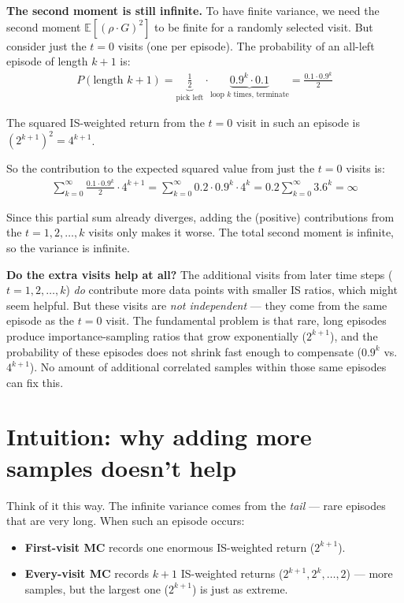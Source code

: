 \documentclass[11pt]{article}
\begin{document}
\textbf{The second moment is still infinite.} To have finite variance, we need the second moment $\mathbb{E}[(\rho \cdot G)^2]$ to be finite for a randomly selected visit. But consider just the $t = 0$ visits (one per episode). The probability of an all-left episode of length $k+1$ is:
\begin{align}
    P(\text{length } k{+}1) = \underbrace{\tfrac{1}{2}}_{\text{pick left}} \cdot \underbrace{0.9^k \cdot 0.1}_{\text{loop $k$ times, terminate}} = \frac{0.1 \cdot 0.9^k}{2}
\end{align}

The squared IS-weighted return from the $t = 0$ visit in such an episode is $(2^{k+1})^2 = 4^{k+1}$.

So the contribution to the expected squared value from just the $t = 0$ visits is:
\begin{align}
    \sum_{k=0}^{\infty} \frac{0.1 \cdot 0.9^k}{2} \cdot 4^{k+1} = \sum_{k=0}^{\infty} 0.2 \cdot 0.9^k \cdot 4^{k} = 0.2 \sum_{k=0}^{\infty} 3.6^k = \infty
\end{align}

Since this partial sum already diverges, adding the (positive) contributions from the $t = 1, 2, \ldots, k$ visits only makes it worse. The total second moment is infinite, so the variance is infinite.

\textbf{Do the extra visits help at all?} The additional visits from later time steps ($t = 1, 2, \ldots, k$) \textit{do} contribute more data points with smaller IS ratios, which might seem helpful. But these visits are \textit{not independent} --- they come from the same episode as the $t = 0$ visit. The fundamental problem is that rare, long episodes produce importance-sampling ratios that grow exponentially ($2^{k+1}$), and the probability of these episodes does not shrink fast enough to compensate ($0.9^k$ vs.\ $4^{k+1}$). No amount of additional correlated samples within those same episodes can fix this.

\section*{Intuition: why adding more samples doesn't help}

Think of it this way. The infinite variance comes from the \textit{tail} --- rare episodes that are very long. When such an episode occurs:

\begin{itemize}[nosep]
    \item \textbf{First-visit MC} records one enormous IS-weighted return ($2^{k+1}$).
    \item \textbf{Every-visit MC} records $k+1$ IS-weighted returns ($2^{k+1}, 2^k, \ldots, 2$) --- more samples, but the largest one ($2^{k+1}$) is just as extreme.
\end{itemize}
\end{document}
